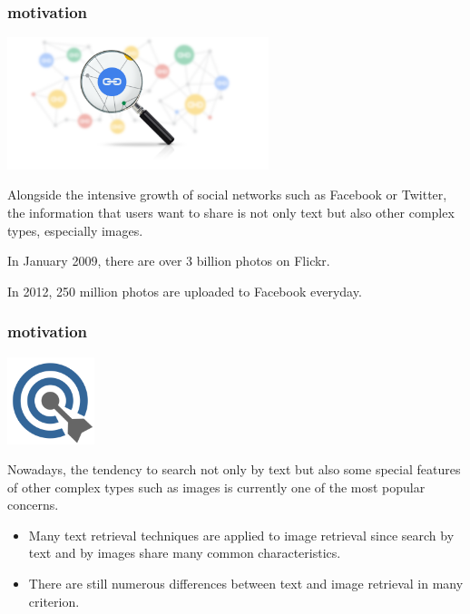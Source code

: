 \begin{frame}[fragile]
  \frametitle{motivation}

  \begin{center}
    \includegraphics[width=3.0in]{images/relevancy.png}
  \end{center}
  
  Alongside the intensive growth of social networks such as Facebook or Twitter, the information that users want to share is not only text but also other complex types, especially images. 
  
  In January 2009, there are over 3 billion photos on Flickr. 

  In 2012, 250 million photos are uploaded to Facebook everyday.

\end{frame}

\begin{frame}[fragile]
  \frametitle{motivation}

    \begin{center}
      \includegraphics[width=1.0in]{images/target.png}
    \end{center}
  
  Nowadays, the tendency to search not only by text but also some special features of other complex types such as images is currently one of the most popular concerns. 

  \begin{itemize}
    \item Many text retrieval techniques are applied to image retrieval since search by text and by images share many common characteristics. 
    \item There are still numerous differences between text and image retrieval in many criterion.
  \end{itemize}

\end{frame}
